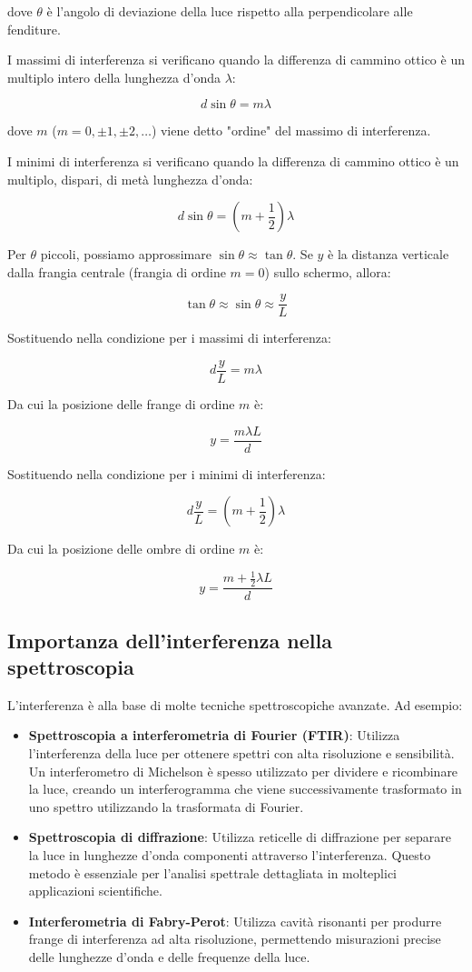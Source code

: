 \documentclass[12pt,a4paper]{report}
\begin{document}
dove \(\theta\) è l'angolo di deviazione della luce rispetto alla perpendicolare alle fenditure.

I massimi di interferenza si verificano quando la differenza di cammino ottico è un multiplo intero della lunghezza d'onda \(\lambda\):
 
\[ d \sin \theta = m \lambda \]

dove \(m\) (\(m = 0, \pm 1, \pm 2, \ldots\)) viene detto "ordine" del massimo di interferenza.
  
I minimi di interferenza si verificano quando la differenza di cammino ottico è un multiplo, dispari, di metà lunghezza d'onda: 

\[ d \sin \theta = \left( m + \frac{1}{2} \right) \lambda \]

Per \(\theta\) piccoli, possiamo approssimare \(\sin \theta \approx \tan \theta\). Se \(y\) è la distanza verticale dalla frangia centrale (frangia di ordine \(m=0\)) sullo schermo, allora:

\[ \tan \theta \approx \sin \theta \approx \frac{y}{L} \]

Sostituendo nella condizione per i massimi di interferenza:

\[ d \frac{y}{L} = m \lambda \]

Da cui la posizione delle frange di ordine \(m\) è:

\[ y = \frac{m \lambda L}{d} \]

Sostituendo nella condizione per i minimi di interferenza:

\[ d \frac{y}{L} = \left( m + \frac{1}{2} \right) \lambda \]

Da cui la posizione delle ombre di ordine \(m\) è:

\[ y = \frac{m + \frac{1}{2} \lambda L}{d} \]

\subsection{Importanza dell'interferenza nella spettroscopia}

L'interferenza è alla base di molte tecniche spettroscopiche avanzate. Ad esempio:

\begin{itemize}
\item \textbf{Spettroscopia a interferometria di Fourier (FTIR)}: Utilizza l'interferenza della luce per ottenere spettri con alta risoluzione e sensibilità. Un interferometro di Michelson è spesso utilizzato per dividere e ricombinare la luce, creando un interferogramma che viene successivamente trasformato in uno spettro utilizzando la trasformata di Fourier.
\item \textbf{Spettroscopia di diffrazione}: Utilizza reticelle di diffrazione per separare la luce in lunghezze d'onda componenti attraverso l'interferenza. Questo metodo è essenziale per l'analisi spettrale dettagliata in molteplici applicazioni scientifiche.
\item \textbf{Interferometria di Fabry-Perot}: Utilizza cavità risonanti per produrre frange di interferenza ad alta risoluzione, permettendo misurazioni precise delle lunghezze d'onda e delle frequenze della luce.
\end{itemize}
\end{document}
